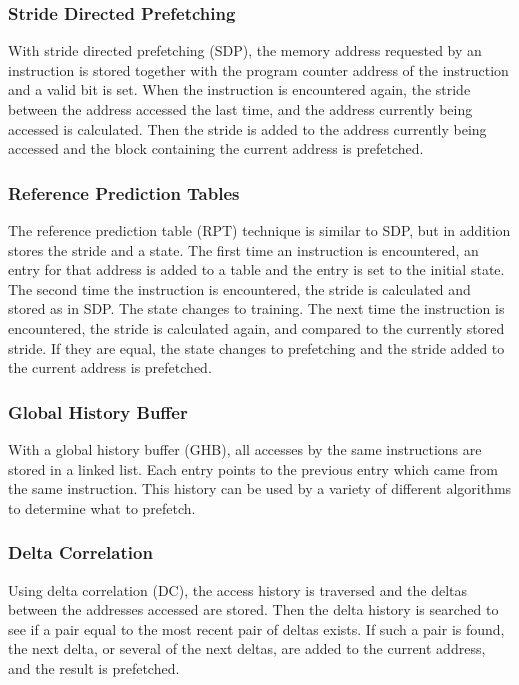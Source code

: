\subsubsection{Stride Directed Prefetching}

With stride directed prefetching (SDP), the memory address requested by an instruction
is stored together with the program counter address of the instruction
and a valid bit is set. When the instruction is encountered again, the stride
between the address accessed the last time, and the address currently being accessed
is calculated. Then the stride is added to the address currently
being accessed and the block containing the current address is prefetched.

\subsubsection{Reference Prediction Tables}

The reference prediction table (RPT) technique is similar to SDP, but in
addition stores the stride and a state. The first time an
instruction is encountered, an entry for that address is added to a table
and the entry is set to the initial state. The second time the
instruction is encountered, the stride is calculated and stored as in SDP.
The state changes to training. The next time the instruction is
encountered, the stride is calculated again, and compared to the
currently stored stride. If they are equal, the state changes to
prefetching and the stride added to the current address is
prefetched.

\subsubsection{Global History Buffer}

With a global history buffer (GHB), all accesses by the same
instructions are stored in a linked list. Each entry points to
the previous entry which came from the same instruction. This
history can be used by a variety of different algorithms to
determine what to prefetch.

\subsubsection{Delta Correlation}

Using delta correlation (DC), the access history is traversed and the
deltas between the addresses accessed are stored. Then the delta
history is searched to see if a pair equal to the most recent pair
of deltas exists. If such a pair is found, the next delta, or
several of the next deltas, are added to the current address,
and the result is prefetched.
